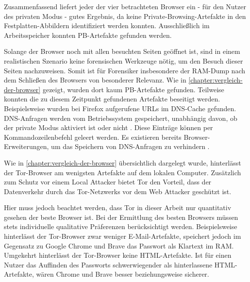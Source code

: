 \begin{comment}
Weiterführende Arbeiten:
> Cross-mode interference \cite{Hedberg.2013}:
	o	the Chrome://memory page displays all the opened tabs in the browser regardless if they are in the usual or private mode -> Nicht mehr aktuell -> Stattdessen: Chrome Task-manager (Ctrl + Esc), Funktioniert auch bei Firefox
> Unser Scope: Process Monitor nach Prozessnamen gefiltert
	- Weiterführend: Nach Pathnamen filtern: "Common Locations"

> Für wen wird Browser entwickelt
> Warum und für wen wird Private Browsing analysiert?
> Ist das Auffinden privater Browsing-Artefakte Schuld von Browser Entwicklern? (Oder Schuld des Betriebssystem, wie in (TODO!) erwähnt)
\end{comment}

Zusammenfassend liefert jeder der vier betrachteten Browser ein - für den Nutzer des privaten Modus - gutes Ergebnis, da keine Private-Browsing-Artefakte in den Festplatten-Abbildern identifiziert werden konnten. 
Ausschließlich im Arbeitsspeicher konnten PB-Artefakte gefunden werden.

Solange der Browser noch mit allen besuchten Seiten geöffnet ist, sind in einem realistischen Szenario keine forensischen Werkzeuge nötig, um den Besuch dieser Seiten nachzuweisen. Somit ist für Forensiker insbesondere der RAM-Dump nach dem Schließen des Browsers von besonderer Relevanz. 
Wie in \autoref{chapter:vergleich-der-browser} gezeigt, wurden dort kaum PB-Artefakte gefunden.
Teilweise konnten die zu diesem Zeitpunkt gefundenen Artefakte beseitigt werden.
Beispielsweise wurden bei Firefox aufgerufene URLs im DNS-Cache gefunden. DNS-Anfragen werden vom Betriebssystem gespeichert, unabhängig davon, ob der private Modus aktiviert ist oder nicht \cite{Satvat.2014}. Diese Einträge können per Kommandozeilenbefehl geleert werden. Es existieren bereits Browser-Erweiterungen, um das Speichern von DNS-Anfragen zu verhindern \cite{Satvat.2014}.

Wie in \autoref{chapter:vergleich-der-browser} übersichtlich dargelegt wurde, hinterlässt der Tor-Browser am wenigsten Artefakte auf dem lokalen Computer. 
Zusätzlich zum Schutz vor einem Local Attacker bietet Tor den Vorteil, dass der Datenverkehr durch das Tor-Netzwerks vor dem Web Attacker geschützt ist. 

Hier muss jedoch beachtet werden, dass Tor in dieser Arbeit nur quantitativ gesehen der beste Browser ist.
Bei der Ermittlung des besten Browsers müssen stets individuelle qualitative Präferenzen berücksichtigt werden. 
Beispielsweise hinterlässt der Tor-Browser zwar weniger E-Mail-Artefakte, speichert jedoch im Gegensatz zu Google Chrome und Brave das Passwort als Klartext im RAM. Umgekehrt hinterlässt der Tor-Browser keine HTML-Artefakte.
Ist für einen Nutzer das Auffinden des Passworts schwerwiegender als hinterlassene HTML-Artefakte, wären Chrome und Brave \glqq{}besser\grqq{} beziehungsweise \glqq{}sicherer\grqq{}.

